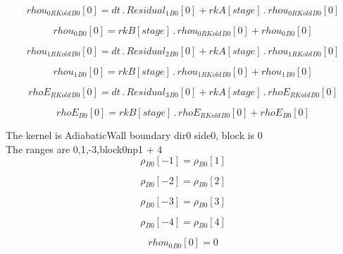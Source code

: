 \documentclass{article}
\begin{document}
\begin{dmath}{rhou_{0 RKold}{_{B0}}}[{0}] = dt \,.\, {Residual_{1}{_{B0}}}[{0}] + {rkA}[{stage}] \,.\, {rhou_{0 RKold}{_{B0}}}[{0}]\end{dmath}

\begin{dmath}{rhou_{0}{_{B0}}}[{0}] = {rkB}[{stage}] \,.\, {rhou_{0 RKold}{_{B0}}}[{0}] + {rhou_{0}{_{B0}}}[{0}]\end{dmath}

\begin{dmath}{rhou_{1 RKold}{_{B0}}}[{0}] = dt \,.\, {Residual_{2}{_{B0}}}[{0}] + {rkA}[{stage}] \,.\, {rhou_{1 RKold}{_{B0}}}[{0}]\end{dmath}

\begin{dmath}{rhou_{1}{_{B0}}}[{0}] = {rkB}[{stage}] \,.\, {rhou_{1 RKold}{_{B0}}}[{0}] + {rhou_{1}{_{B0}}}[{0}]\end{dmath}

\begin{dmath}{rhoE_{RKold}{_{B0}}}[{0}] = dt \,.\, {Residual_{3}{_{B0}}}[{0}] + {rkA}[{stage}] \,.\, {rhoE_{RKold}{_{B0}}}[{0}]\end{dmath}

\begin{dmath}{rhoE{_{B0}}}[{0}] = {rkB}[{stage}] \,.\, {rhoE_{RKold}{_{B0}}}[{0}] + {rhoE{_{B0}}}[{0}]\end{dmath}

\noindent The kernel is AdiabaticWall boundary dir0 side0, block is 0\\\noindent The ranges are 0,1,-3,block0np1 + 4\\\begin{dmath}{\rho{_{B0}}}[{-1}] = {\rho{_{B0}}}[{1}]\end{dmath}

\begin{dmath}{\rho{_{B0}}}[{-2}] = {\rho{_{B0}}}[{2}]\end{dmath}

\begin{dmath}{\rho{_{B0}}}[{-3}] = {\rho{_{B0}}}[{3}]\end{dmath}

\begin{dmath}{\rho{_{B0}}}[{-4}] = {\rho{_{B0}}}[{4}]\end{dmath}

\begin{dmath}{rhou_{0}{_{B0}}}[{0}] = 0\end{dmath}
\end{document}
